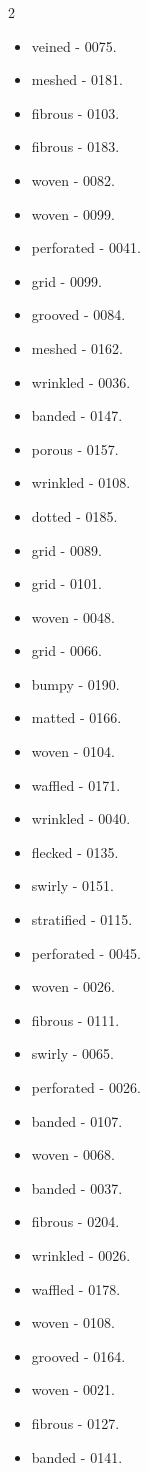\begin{multicols}{2}
\begin{itemize}
\item veined - 0075.
\item meshed - 0181.
\item fibrous - 0103.
\item fibrous - 0183.
\item woven - 0082.
\item woven - 0099.
\item perforated - 0041.
\item grid - 0099.
\item grooved - 0084.
\item meshed - 0162.
\item wrinkled - 0036.
\item banded - 0147.
\item porous - 0157.
\item wrinkled - 0108.
\item dotted - 0185.
\item grid - 0089.
\item grid - 0101.
\item woven - 0048.
\item grid - 0066.
\item bumpy - 0190.
\item matted - 0166.
\item woven - 0104.
\item waffled - 0171.
\item wrinkled - 0040.
\item flecked - 0135.
\item swirly - 0151.
\item stratified - 0115.
\item perforated - 0045.
\item woven - 0026.
\item fibrous - 0111.
\item swirly - 0065.
\item perforated - 0026.
\item banded - 0107.
\item woven - 0068.
\item banded - 0037.
\item fibrous - 0204.
\item wrinkled - 0026.
\item waffled - 0178.
\item woven - 0108.
\item grooved - 0164.
\item woven - 0021.
\item fibrous - 0127.
\item banded - 0141.

\end{itemize}
\end{multicols}
